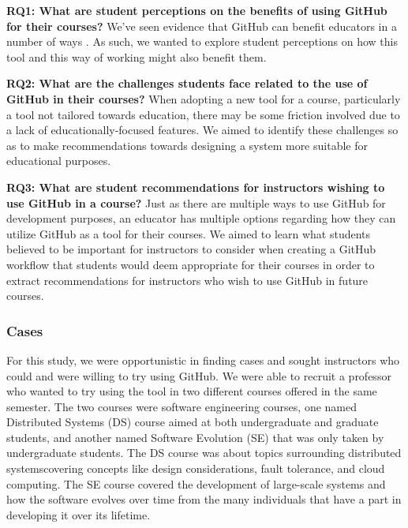 \textbf{RQ1: What are student perceptions on the benefits of using GitHub for their courses?} We've seen evidence that GitHub can benefit educators in a number of ways \cite{zagalsky2015emergence}. As such, we wanted to explore student perceptions on how this tool and this way of working might also benefit them.

\textbf{RQ2: What are the challenges students face related to the use of GitHub in their courses?} When adopting a new tool for a course, particularly a tool not tailored towards education, there may be some friction involved due to a lack of educationally-focused features. We aimed to identify these challenges so as to make recommendations towards designing a system more suitable for educational purposes.

\textbf{RQ3: What are student recommendations for instructors wishing to use GitHub in a course?} Just as there are multiple ways to use GitHub for development purposes, an educator has multiple options regarding how they can utilize GitHub as a tool for their courses. We aimed to learn what students believed to be important for instructors to consider when creating a GitHub workflow that students would deem appropriate for their courses in order to extract recommendations for instructors who wish to use GitHub in future courses.

\subsubsection{Cases}
For this study, we were opportunistic in finding cases and sought instructors who could and were willing to try using GitHub. We were able to recruit a professor who wanted to try using the tool in two different courses offered in the same semester. The two courses were software engineering courses, one named Distributed Systems (DS) course aimed at both undergraduate and graduate students, and another named Software Evolution (SE) that was only taken by undergraduate students. The DS course was about topics surrounding distributed systemscovering concepts like design considerations, fault tolerance, and cloud computing. The SE course covered the development of large-scale systems and how the software evolves over time from the many individuals that have a part in developing it over its lifetime.

